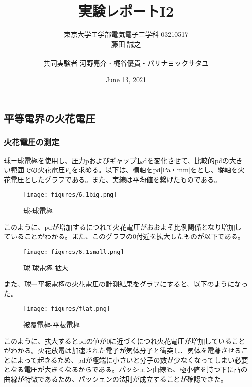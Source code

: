 \documentclass{ltjsarticle}
\title{実験レポートI2}
\author{東京大学工学部電気電子工学科 03210517\\藤田 誠之\\~\\ 共同実験者  河野亮介・梶谷優貴・パリナヨックサタユ}
\date{June 13, 2021}
\begin{document}
\maketitle

\setcounter{section}{6}

\subsection{平等電界の火花電圧}
\subsubsection{火花電圧の測定}

球ー球電極を使用し、圧力pおよびギャップ長dを変化させて、比較的pdの大きい範囲での火花電圧$V_s$を求める。以下は、横軸をpd[Pa・mm]をとし、縦軸を火花電圧としたグラフである。また、実線は平均値を繋げたものである。

\begin{figure}[H]
    \begin{center}
        \texttt{[image: figures/6.1big.png]}
        \caption{球-球電極}
    \end{center}
\end{figure}

このように、pdが増加するにつれて火花電圧がおおよそ比例関係となり増加していることがわかる。また、このグラフの0付近を拡大したものが以下である。

\begin{figure}[H]
    \begin{center}
        \texttt{[image: figures/6.1small.png]}
        \caption{球-球電極 拡大}
    \end{center}
\end{figure}

また、球ー平板電極の火花電圧の計測結果をグラフにすると、以下のようになった。

\begin{figure}[H]
    \begin{center}
        \texttt{[image: figures/flat.png]}
        \caption{被覆電極-平板電極}
    \end{center}
\end{figure}

このように、拡大するとpdの値が0に近づくにつれ火花電圧が増加していることがわかる。火花放電は加速された電子が気体分子と衝突し、気体を電離させることによって起きるため、pdが極端に小さいと分子の数が少なくなってしまい必要となる電圧が大きくなるからである。パッシェン曲線も、極小値を持つ下に凸の曲線が特徴であるため、パッシェンの法則が成立することが確認できた。
\end{document}
